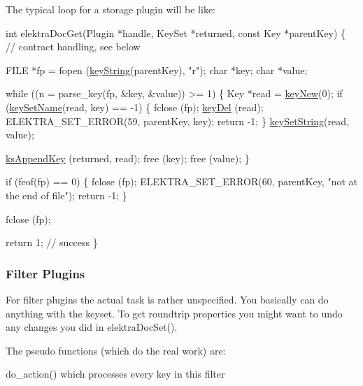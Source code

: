 The typical loop for a storage plugin will be like\-: 
\begin{DoxyCode}
\textcolor{keywordtype}{int} elektraDocGet(Plugin *handle, KeySet *returned, \textcolor{keyword}{const} Key *parentKey)
\{
        \textcolor{comment}{// contract handling, see below}

        FILE *fp = fopen (\hyperlink{group__keyvalue_ga880936f2481d28e6e2acbe7486a21d05}{keyString}(parentKey), \textcolor{stringliteral}{"r"});
        \textcolor{keywordtype}{char} *key;
        \textcolor{keywordtype}{char} *value;

        \textcolor{keywordflow}{while} ((n = parse\_key(fp, &key, &value)) >= 1)
        \{
                Key *read = \hyperlink{group__key_gaf6893c038b3ebee90c73a9ea8356bebf}{keyNew}(0);
                \textcolor{keywordflow}{if} (\hyperlink{group__keyname_ga7699091610e7f3f43d2949514a4b35d9}{keySetName}(read, key) == -1)
                \{
                        fclose (fp);
                        \hyperlink{group__key_ga3df95bbc2494e3e6703ece5639be5bb1}{keyDel} (read);
                        ELEKTRA\_SET\_ERROR(59, parentKey, key);
                        \textcolor{keywordflow}{return} -1;
                \}
                \hyperlink{group__keyvalue_ga622bde1eb0e0c4994728331326340ef2}{keySetString}(read, value);

                \hyperlink{group__keyset_gaa5a1d467a4d71041edce68ea7748ce45}{ksAppendKey} (returned, read);
                free (key);
                free (value);
        \}

        \textcolor{keywordflow}{if} (feof(fp) == 0)
        \{
                fclose (fp);
                ELEKTRA\_SET\_ERROR(60, parentKey, \textcolor{stringliteral}{"not at the end of file"});
                \textcolor{keywordflow}{return} -1;
        \}

        fclose (fp);

        \textcolor{keywordflow}{return} 1; \textcolor{comment}{// success}
\}
\end{DoxyCode}
\hypertarget{group__plugin_filter}{}\subsubsection{Filter Plugins}\label{group__plugin_filter}
For filter plugins the actual task is rather unspecified. You basically can do anything with the keyset. To get roundtrip properties you might want to undo any changes you did in elektra\-Doc\-Set().

The pseudo functions (which do the real work) are\-:
\begin{DoxyItemize}
\item do\-\_\-action() which processes every key in this filter
\end{DoxyItemize}


